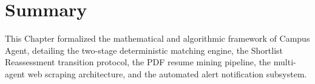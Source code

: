 \section{Summary} \label{S4.7}
This Chapter formalized the mathematical and algorithmic framework of Campus Agent, detailing the two-stage deterministic matching engine, the Shortlist Reassessment transition protocol, the PDF resume mining pipeline, the multi-agent web scraping architecture, and the automated alert notification subsystem.
